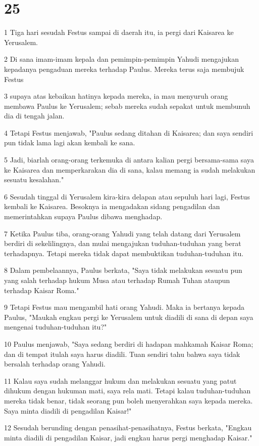 \chapter{25}

\par 1 Tiga hari sesudah Festus sampai di daerah itu, ia pergi dari Kaisarea ke Yerusalem.
\par 2 Di sana imam-imam kepala dan pemimpin-pemimpin Yahudi mengajukan kepadanya pengaduan mereka terhadap Paulus. Mereka terus saja membujuk Festus
\par 3 supaya atas kebaikan hatinya kepada mereka, ia mau menyuruh orang membawa Paulus ke Yerusalem; sebab mereka sudah sepakat untuk membunuh dia di tengah jalan.
\par 4 Tetapi Festus menjawab, "Paulus sedang ditahan di Kaisarea; dan saya sendiri pun tidak lama lagi akan kembali ke sana.
\par 5 Jadi, biarlah orang-orang terkemuka di antara kalian pergi bersama-sama saya ke Kaisarea dan memperkarakan dia di sana, kalau memang ia sudah melakukan sesuatu kesalahan."
\par 6 Sesudah tinggal di Yerusalem kira-kira delapan atau sepuluh hari lagi, Festus kembali ke Kaisarea. Besoknya ia mengadakan sidang pengadilan dan memerintahkan supaya Paulus dibawa menghadap.
\par 7 Ketika Paulus tiba, orang-orang Yahudi yang telah datang dari Yerusalem berdiri di sekelilingnya, dan mulai mengajukan tuduhan-tuduhan yang berat terhadapnya. Tetapi mereka tidak dapat membuktikan tuduhan-tuduhan itu.
\par 8 Dalam pembelaannya, Paulus berkata, "Saya tidak melakukan sesuatu pun yang salah terhadap hukum Musa atau terhadap Rumah Tuhan ataupun terhadap Kaisar Roma."
\par 9 Tetapi Festus mau mengambil hati orang Yahudi. Maka ia bertanya kepada Paulus, "Maukah engkau pergi ke Yerusalem untuk diadili di sana di depan saya mengenai tuduhan-tuduhan itu?"
\par 10 Paulus menjawab, "Saya sedang berdiri di hadapan mahkamah Kaisar Roma; dan di tempat itulah saya harus diadili. Tuan sendiri tahu bahwa saya tidak bersalah terhadap orang Yahudi.
\par 11 Kalau saya sudah melanggar hukum dan melakukan sesuatu yang patut dihukum dengan hukuman mati, saya rela mati. Tetapi kalau tuduhan-tuduhan mereka tidak benar, tidak seorang pun boleh menyerahkan saya kepada mereka. Saya minta diadili di pengadilan Kaisar!"
\par 12 Sesudah berunding dengan penasihat-penasihatnya, Festus berkata, "Engkau minta diadili di pengadilan Kaisar, jadi engkau harus pergi menghadap Kaisar."
